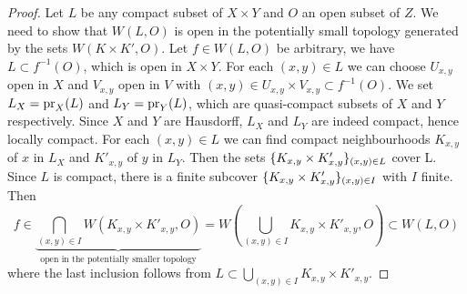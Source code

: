 \begin{proof}
Let $L$ be any compact subset of $X\times Y$ and $O$ an open subset of $Z$. We need to show that $W(L,O)$ is open in the potentially small topology generated by the sets $W(K\times K',O)$. Let $f\in W(L,O)$ be arbitrary, we have $L\subset f^{-1}(O)$, which is open in $X\times Y$. For each $(x,y)\in L$ we can choose $U_{x,y}$ open in $X$ and $V_{x,y}$ open in $V$ with $(x,y)\in U_{x,y}\times V_{x,y}\subset f^{-1}(O)$. We set $L_X=\operatorname{pr}_X(L)$ and $L_Y=\operatorname{pr}_Y(L)$, which are quasi-compact subsets of $X$ and $Y$ respectively. Since $X$ and $Y$ are Hausdorff, $L_X$ and $L_Y$ are indeed compact, hence locally compact. For each $(x,y)\in L$ we can find compact neighbourhoods $K_{x,y}$ of $x$ in $L_X$ and $K'_{x,y}$ of $y$ in $L_Y$. Then the sets $\{K_{x,y}\times K'_{x,y}\}_{(x,y)\in L}$ cover L. Since $L$ is compact, there is a finite subcover $\{K_{x,y}\times K'_{x,y}\}_{(x,y)\in I}$ with $I$ finite. Then
\[f\in\underbrace{\bigcap_{(x,y)\in I}W(K_{x,y}\times K'_{x,y},O)}_{\text{open in the potentially smaller topology}}=W(\bigcup_{(x,y)\in I}K_{x,y}\times K'_{x,y},O)\subset W(L,O)\]
where the last inclusion follows from $L\subset \bigcup_{(x,y)\in I}K_{x,y}\times K'_{x,y}$.
\end{proof}

